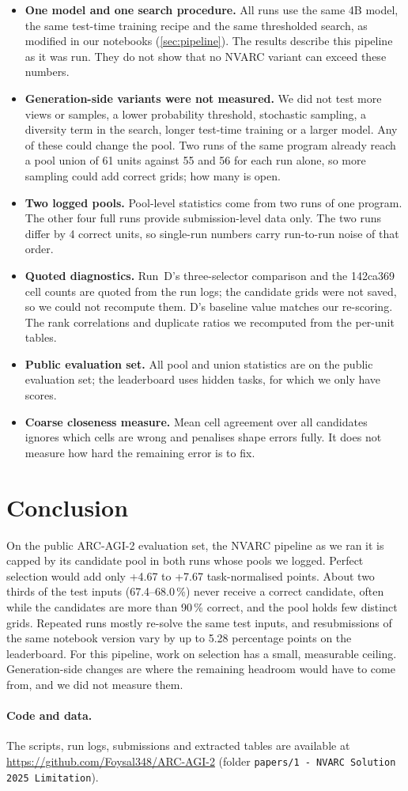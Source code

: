 \documentclass[11pt]{article}
\newcommand{\code}[1]{\texttt{#1}}
\begin{document}
\begin{itemize}
\item \textbf{One model and one search procedure.} All runs use the same 4B model, the same test-time training recipe and the same thresholded search, as modified in our notebooks (\cref{sec:pipeline}). The results describe this pipeline as it was run. They do not show that no NVARC variant can exceed these numbers.
\item \textbf{Generation-side variants were not measured.} We did not test more views or samples, a lower probability threshold, stochastic sampling, a diversity term in the search, longer test-time training or a larger model. Any of these could change the pool. Two runs of the same program already reach a pool union of 61 units against 55 and 56 for each run alone, so more sampling could add correct grids; how many is open.
\item \textbf{Two logged pools.} Pool-level statistics come from two runs of one program. The other four full runs provide submission-level data only. The two runs differ by 4 correct units, so single-run numbers carry run-to-run noise of that order.
\item \textbf{Quoted diagnostics.} Run~D's three-selector comparison and the 142ca369 cell counts are quoted from the run logs; the candidate grids were not saved, so we could not recompute them. D's baseline value matches our re-scoring. The rank correlations and duplicate ratios we recomputed from the per-unit tables.
\item \textbf{Public evaluation set.} All pool and union statistics are on the public evaluation set; the leaderboard uses hidden tasks, for which we only have scores.
\item \textbf{Coarse closeness measure.} Mean cell agreement over all candidates ignores which cells are wrong and penalises shape errors fully. It does not measure how hard the remaining error is to fix.
\end{itemize}

\section{Conclusion}

On the public ARC-AGI-2 evaluation set, the NVARC pipeline as we ran it is capped by its candidate pool in both runs whose pools we logged.
Perfect selection would add only +4.67 to +7.67 task-normalised points. About two thirds of the test inputs (67.4--68.0\,\%) never receive a correct candidate, often while the candidates are more than 90\,\% correct, and the pool holds few distinct grids.
Repeated runs mostly re-solve the same test inputs, and resubmissions of the same notebook version vary by up to 5.28 percentage points on the leaderboard.
For this pipeline, work on selection has a small, measurable ceiling. Generation-side changes are where the remaining headroom would have to come from, and we did not measure them.

\paragraph{Code and data.}
The scripts, run logs, submissions and extracted tables are available at \url{https://github.com/Foysal348/ARC-AGI-2} (folder \code{papers/1 - NVARC Solution 2025 Limitation}).



\end{document}
